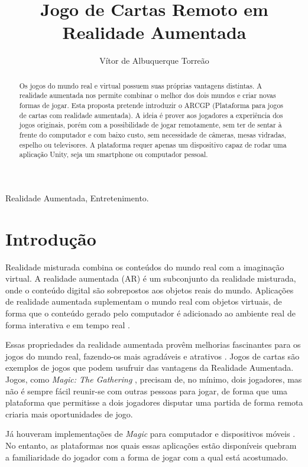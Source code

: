 \documentclass[conference]{IEEEtran}
\title{Jogo de Cartas Remoto em Realidade Aumentada}
\author{Vítor de Albuquerque Torreão}
\begin{document}
\maketitle

\begin{abstract}
	Os jogos do mundo real e virtual possuem suas próprias vantagens distintas. 
	A realidade aumentada nos permite combinar o melhor dos dois mundos e criar 
	novas formas de jogar. Esta proposta pretende introduzir o ARCGP (Plataforma 
	para jogos de cartas com realidade aumentada). A ideia é prover aos 
	jogadores a experiência dos jogos originais, porém com a possibilidade de 
	jogar remotamente, sem ter de sentar à frente do computador e com baixo 
	custo, sem necessidade de câmeras, mesas vidradas, espelho ou televisores. 
	A plataforma requer apenas um dispositivo capaz de rodar uma aplicação 
	Unity, seja um smartphone ou computador pessoal.
\end{abstract}

\begin{IEEEkeywords}
	Realidade Aumentada, Entretenimento.
\end{IEEEkeywords}

\section{Introdução}
Realidade misturada combina os conteúdos do mundo real com a imaginação virtual.
A realidade aumentada (AR) é um subconjunto da realidade misturada, onde o 
conteúdo digital são sobrepostos aos objetos reais do mundo. Aplicações de 
realidade aumentada suplementam o mundo real com objetos virtuais, de forma que 
o conteúdo gerado pelo computador é adicionado ao ambiente real de forma 
interativa e em tempo real \cite{burdea2003virtual}.

Essas propriedades da realidade aumentada provêm melhorias fascinantes para os 
jogos do mundo real, fazendo-os mais agradáveis e atrativos 
\cite{Lam:2006:AAR:1128923.1128987}. Jogos de cartas são exemplos de jogos que 
podem usufruir das vantagens da Realidade Aumentada. Jogos, como \textit{Magic: 
The Gathering} \cite{magic}, precisam de, no mínimo, dois jogadores, mas não é 
sempre fácil reunir-se com outras pessoas para jogar, de forma que uma 
plataforma que permitisse a dois jogadores disputar uma partida de forma 
remota criaria mais oportunidades de jogo.

Já houveram implementações de \textit{Magic} para computador e dispositivos 
móveis \cite{magic_duels}. No entanto, as plataformas nos quais essas 
aplicações estão disponíveis quebram  a familiaridade do jogador com a forma 
de jogar com a qual está acostumado.
\end{document}
